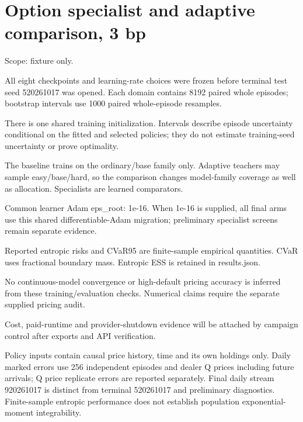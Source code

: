\documentclass[10pt]{article}
\begin{document}
\section*{Option specialist and adaptive comparison, 3 bp}
Scope: fixture only.\par
All eight checkpoints and learning-rate choices were frozen before terminal test seed 520261017 was opened. Each domain contains 8192 paired whole episodes; bootstrap intervals use 1000 paired whole-episode resamples.\par
There is one shared training initialization. Intervals describe episode uncertainty conditional on the fitted and selected policies; they do not estimate training-seed uncertainty or prove optimality.\par
The baseline trains on the ordinary/base family only. Adaptive teachers may sample easy/base/hard, so the comparison changes model-family coverage as well as allocation. Specialists are learned comparators.\par
Common learner Adam eps\_root: 1e-16. When 1e-16 is supplied, all final arms use this shared differentiable-Adam migration; preliminary specialist screens remain separate evidence.\par
Reported entropic risks and CVaR95 are finite-sample empirical quantities. CVaR uses fractional boundary mass. Entropic ESS is retained in results.json.\par
No continuous-model convergence or high-default pricing accuracy is inferred from these training/evaluation checks. Numerical claims require the separate supplied pricing audit.\par
Cost, paid-runtime and provider-shutdown evidence will be attached by campaign control after exports and API verification.\par
Policy inputs contain causal price history, time and its own holdings only. Daily marked errors use 256 independent episodes and dealer Q prices including future arrivals; Q price replicate errors are reported separately. Final daily stream 920261017 is distinct from terminal 520261017 and preliminary diagnostics. Finite-sample entropic performance does not establish population exponential-moment integrability.\par
\end{document}
